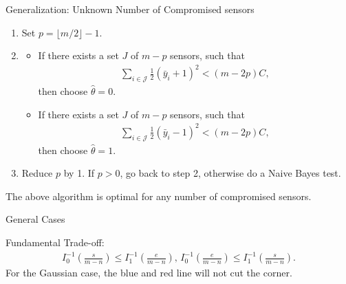 \documentclass[10pt]{beamer}
\newcommand{\tikzdir}[1]{#1.tikz}
\newcommand{\inputtikz}[1]{}}
\begin{document}
\begin{frame}{Generalization: Unknown Number of Compromised sensors}
  \begin{enumerate}
  \item Set $p = \lfloor m/2\rfloor -1$.
  \item 
    \begin{itemize}
    \item If there exists a set $J$ of $m-p$ sensors, such that
      \begin{align*}
        \sum_{i\in \mathcal J}\frac{1}{2}(\bar y_i+1)^2 < (m-2p)C,
      \end{align*}
      then choose $\hat \theta = 0$. 
    \item If there exists a set $J$ of $m-p$ sensors, such that
      \begin{align*}
        \sum_{i\in \mathcal J}\frac{1}{2}(\bar y_i-1)^2 < (m-2p)C,
      \end{align*}
      then choose $\hat \theta = 1$. 
    \end{itemize}
  \item Reduce $p$ by 1. If $p > 0$, go back to step 2, otherwise do a Naive Bayes test.
  \end{enumerate}
  The above algorithm is optimal for any number of compromised sensors.
\end{frame}


\begin{frame}{General Cases}
  \begin{center}
    \inputtikz{fun_lim}
  \end{center}
  Fundamental Trade-off:
  \begin{align*}
I_0^{-1}\left(\frac{s}{m-n}\right)\leq I_1^{-1}\left(\frac{e}{m-n}\right),\, I_0^{-1}\left(\frac{e}{m-n}\right)\leq I_1^{-1}\left(\frac{s}{m-n}\right). 
  \end{align*}
  For the Gaussian case, the blue and red line will not cut the corner.
\end{frame}
\end{document}
